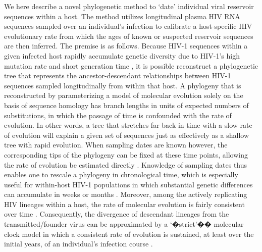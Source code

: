\documentclass[12pt]{article}
\begin{document}
We here describe a novel phylogenetic method to `date' individual viral reservoir sequences within a host.
The method utilizes longitudinal plasma HIV RNA sequences sampled over an individual's infection to calibrate a host-specific HIV evolutionary rate from which the ages of known or suspected reservoir sequences are then inferred. The premise is as follows.
Because HIV-1 sequences within a given infected host rapidly accumulate genetic diversity due to HIV-1's high mutation rate and short generation time \citep{Alizon13,Rambaut04,Shankarappa99}, it is possible reconstruct a phylogenetic tree that represents the ancestor-descendant relationships between HIV-1 sequences sampled longitudinally from within that host.
A phylogeny that is reconstructed by parameterizing a model of molecular evolution solely on the basis of sequence homology \citep[\emph{e.g.}, by maximum likelihood estimation;][]{Felsenstein81} has branch lengths in units of expected numbers of substitutions, in which the passage of time is confounded with the rate of evolution.
In other words, a tree that stretches far back in time with a slow rate of evolution will explain a given set of sequences just as effectively as a shallow tree with rapid evolution.
When sampling dates are known however, the corresponding tips of the phylogeny can be fixed at these time points, allowing the rate of evolution be estimated directly \citep{Rodrigo99}.
Knowledge of sampling dates thus enables one to rescale a phylogeny in chronological time, which is especially useful for within-host HIV-1 populations in which substantial genetic differences can accumulate in weeks or months \citep{Williamson03}.
Moreover, among the actively replicating HIV lineages within a host, the rate of molecular evolution is fairly consistent over time \citep{Korber00,Kuhner95,Leitner99}.
Consequently, the divergence of descendant lineages from the transmitted/founder virus can be approximated by a `�strict'�� molecular clock model in which a consistent rate of evolution is sustained, at least over the initial years, of an individual's infection course \citep{Keele08}. 
\end{document}
